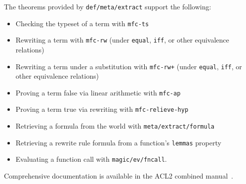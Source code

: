 The theorems provided by \texttt{def\-/meta\-/extract} support the following:
\begin{itemize}
\item Checking the typeset of a term with \texttt{mfc-ts}
\item Rewriting a term with \texttt{mfc-rw}
  (under \texttt{equal}, \texttt{iff}, or other equivalence relations)
\item Rewriting a term under a substitution with \texttt{mfc-rw+}
  (under \texttt{equal}, \texttt{iff}, or other equivalence relations)
\item Proving a term false via linear arithmetic with \texttt{mfc-ap}
\item Proving a term true via rewriting with \texttt{mfc-relieve-hyp}
\item Retrieving a formula from the world with \texttt{meta\-/extract\-/formula}
\item Retrieving a rewrite rule formula from a function's \texttt{lemmas} property
\item Evaluating a function call with \texttt{magic\-/ev\-/fncall}.
\end{itemize}
Comprehensive documentation is available in the ACL2 combined
manual~\cite{acl2:doc}.
